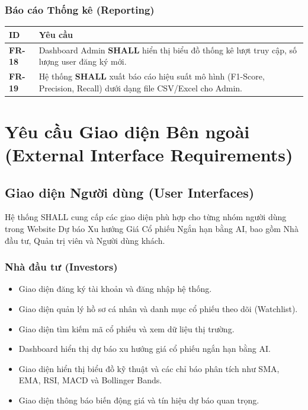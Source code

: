 \documentclass[12pt, a4paper]{article}
\begin{document}
\subsubsection{Báo cáo Thống kê (Reporting)}

\begin{table}[H]
    \centering
    \renewcommand{\arraystretch}{1.3}
    \begin{tabularx}{\textwidth}{|l|X|}
        \hline
        \rowcolor{gray!10}
        \textbf{ID}    & \textbf{Yêu cầu}                                                                                                         \\
        \hline
        \textbf{FR-18} & Dashboard Admin \textbf{SHALL} hiển thị biểu đồ thống kê lượt truy cập, số lượng user đăng ký mới.                       \\
        \hline
        \textbf{FR-19} & Hệ thống \textbf{SHALL} xuất báo cáo hiệu suất mô hình (F1-Score, Precision, Recall) dưới dạng file CSV/Excel cho Admin. \\
        \hline
    \end{tabularx}
\end{table}
\section{Yêu cầu Giao diện Bên ngoài (External Interface Requirements)}

\subsection{Giao diện Người dùng (User Interfaces)}

Hệ thống SHALL cung cấp các giao diện phù hợp cho từng nhóm người dùng trong Website Dự báo Xu hướng Giá Cổ phiếu Ngắn hạn bằng AI, bao gồm Nhà đầu tư, Quản trị viên và Người dùng khách.


\subsubsection{Nhà đầu tư (Investors)}
\begin{itemize}
    \item Giao diện đăng ký tài khoản và đăng nhập hệ thống.

    \item Giao diện quản lý hồ sơ cá nhân và danh mục cổ phiếu theo dõi (Watchlist).

    \item Giao diện tìm kiếm mã cổ phiếu và xem dữ liệu thị trường.

    \item Dashboard hiển thị dự báo xu hướng giá cổ phiếu ngắn hạn bằng AI.

    \item Giao diện hiển thị biểu đồ kỹ thuật và các chỉ báo phân tích như SMA, EMA, RSI, MACD và Bollinger Bands.

    \item Giao diện thông báo biến động giá và tín hiệu dự báo quan trọng.
\end{itemize}
\end{document}
